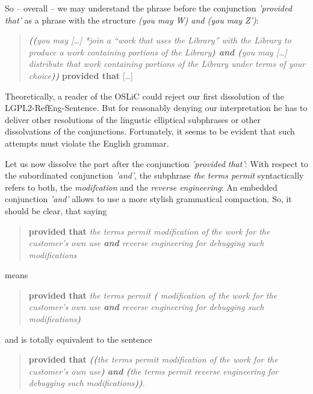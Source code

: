 So -- overall -- we may understand the phrase before the conjunction
\emph{'provided that'} as a phrase with the structure \emph{(you may W) and (you
may Z')}:

\begin{quote}\noindent\emph{\textbf{((}you may [\ldots] \emph{*join} a
\enquote{work that uses the Library} with the Library to produce a work
containing portions of the Library\textbf{) and (}you may [\ldots] distribute
that work containing portions of the Library under terms of your
choice\textbf{))}} \textbf{provided that} [\ldots]\end{quote}

Theoretically, a reader of the OSLiC could reject our first dissolution of the
LGPL2-RefEng-Sentence. But for reasonably denying our interpretation he has to
deliver other resolutions of the lingustic elliptical subphrases or other
dissolvations of the conjunctions. Fortunately, it seems to be evident that such
attempts must violate the English grammar.

Let us now dissolve the part after the conjunction \emph{'provided that'}:
With respect to the subordinated conjunction \emph{'and'}, the subphrase
\emph{the terms permit} syntactically refers to both, the \emph{modifcation} and
the \emph{reverse engineering}: An embedded conjunction \emph{'and'} allows to
use a more stylish grammatical compaction. So, it should be clear, that saying

\begin{quote}\noindent\textbf{provided that} \emph{the terms permit modification
of the work for the customer's own use \emph{\textbf{and}} reverse engineering
for debugging such modifications}\end{quote}

means

\begin{quote}\noindent\textbf{provided that} \emph{the terms permit
\textbf{(} modification of the work for the customer's own use \emph{\textbf{and}}
reverse engineering for debugging such modifications\textbf{)}}\end{quote}

and is totally equivalent to the sentence 

\begin{quote}\noindent[\ldots] \textbf{provided that} \emph{\textbf{((}the terms
permit modification of the work for the customer's own use\textbf{)}
\emph{\textbf{and}} \textbf{(}the terms permit reverse engineering for debugging
such modifications\textbf{))}}.
\end{quote}

